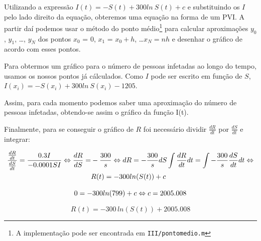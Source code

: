 \documentclass[portuguese, a4paper]{article}
\newcommand\tu[0]{\textunderscore}
\newcommand\eq[0]{\Leftrightarrow}
\begin{document}
		\subsubsection{} \label{sec:III.2c)}
		\par
		Utilizando a expressão $I(t) = -S(t) + 300ln~S(t) + c$ e substituindo
		os $I$ pelo lado direito da equação, obteremos uma equação na forma de
		um PVI\@. A partir daí podemos usar o método do ponto médio\footnote{A
		implementação pode ser encontrada em \texttt{III/ponto\tu medio.m}}
		para calcular aproximações $y_0$, $y_1$, \ldots, $y_N$ dos pontos $x_0$
		= 0, $x_1$ = $x_0 + h$, \ldots $x_N= nh$ e desenhar o gráfico de acordo
		com esses pontos.

		\par
		Para obtermos um gráfico para o número de pessoas infetadas ao longo do
		tempo, usamos os nossos pontos já cálculados. Como $I$ pode ser escrito
		em função de $S$, $I(x_i) = -S(x_i) + 300ln~S(x_i) - 1205$.

		\par
		Assim, para cada momento podemos saber uma aproximação do número de
		pessoas infetadas, obtendo-se assim	o gráfico da função I(t).

		\par \null \par
		Finalmente, para se conseguir o gráfico de $R$ foi necessário
		dividir $\frac{dR}{dt}$ por $\frac{dS}{dt}$ e integrar:

		\begin{equation}
		\begin{split}
			\frac{\frac{dR}{dt}}{\frac{dS}{dt}} = \frac{0.3 I}{-0.0001 S I}
			\eq
			\frac{dR}{dS} = &-\frac{300}{s} \eq dR =
			-\frac{300}{s} dS
			\int \frac{dR}{dt}dt = \int -\frac{300}{s} \frac{dS}{dt}dt
			\eq \\ \newline
			& R(t) = -300 ln(S(t)) + c
		\end{split}
		\end{equation}

		\begin{equation}
			0 = -300 ln(799) + c \eq \\
			c = 2005.008 \\
		\end{equation}

		\begin{equation}
			R(t) = -300\, ln(S(t)) + 2005.008
		\end{equation}
\end{document}
